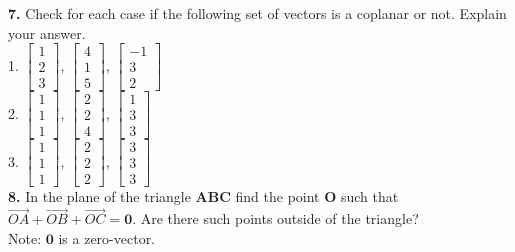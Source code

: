 \documentclass[a4paper,10pt]{article}
\begin{document}
\textbf{7.} Check for each case if the following set of vectors is a coplanar or not. Explain your answer. \\
1. $\begin{bmatrix}
  1 \\
  2 \\
  3
 \end{bmatrix}$,
  $\begin{bmatrix}
  4 \\
  1 \\
  5
 \end{bmatrix}$, 
  $\begin{bmatrix}
  -1 \\
  3 \\
  2
 \end{bmatrix}$ \\
2. $\begin{bmatrix}
  1 \\
  1 \\
  1
 \end{bmatrix}$,
  $\begin{bmatrix}
  2 \\
  2 \\
  4
 \end{bmatrix}$, 
  $\begin{bmatrix}
  1 \\
  3 \\
  3
 \end{bmatrix}$ \\
3. $\begin{bmatrix}
  1 \\
  1 \\
  1
 \end{bmatrix}$,
  $\begin{bmatrix}
  2 \\
  2 \\
  2
 \end{bmatrix}$, 
  $\begin{bmatrix}
  3 \\
  3 \\
  3
 \end{bmatrix}$ \\
 
\textbf{8.} In the plane of the triangle $ \mathbf{ABC}$ find the point $ \mathbf{O}$ such that $\overrightarrow{OA} + \overrightarrow{OB} + \overrightarrow{OC} = \mathbf{0}$. Are there such points outside of the triangle? \\
Note: $ \mathbf{0}$ is a zero-vector. \\
\end{document}
